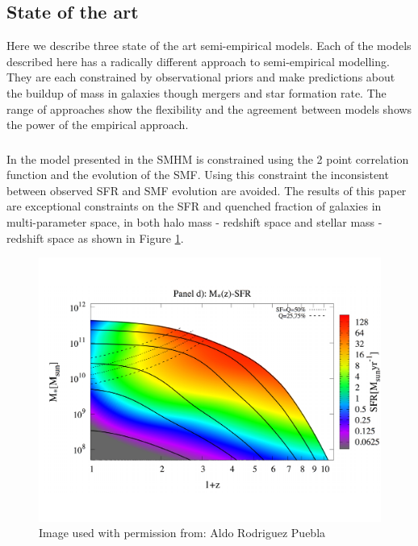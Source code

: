 \subsection{State of the art}
Here we describe three state of the art semi-empirical models. Each of the models described here has a radically different approach to semi-empirical modelling. They are each constrained by observational priors and make predictions about the buildup of mass in galaxies though mergers and star formation rate. The range of approaches show the flexibility and the agreement between models shows the power of the empirical approach. 


\subsubsection{\citet{Rodriguez-Puebla2017ConstrainingProperties}}
In the model presented in \citet{Rodriguez-Puebla2017ConstrainingProperties} the SMHM is constrained using the 2 point correlation function and the evolution of the SMF. Using this constraint the inconsistent between observed SFR and SMF evolution are avoided. The results of this paper are exceptional constraints on the SFR and quenched fraction of galaxies in multi-parameter space, in both halo mass - redshift space and stellar mass - redshift space as shown in Figure \ref{fig:RP_fig}.

\begin{figure}[h]
    \centering
    \includegraphics[width = \linewidth]{Figures/Chapter1/RP17_fig9.pdf}
    \caption{Image used with permission from: Aldo Rodriguez Puebla \cite{Rodriguez-Puebla2017ConstrainingProperties}}
    \label{fig:RP_fig}
\end{figure}


